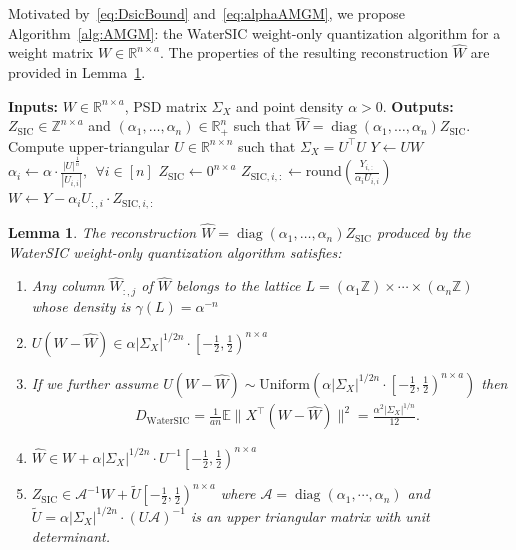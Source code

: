 \documentclass[journal]{IEEEtran}
\newcommand{\ZZ}{\mathbb{Z}}
\newcommand{\RR}{\mathbb{R}}
\newcommand{\diag}{\mathop{\mathrm{diag}}}
\newcommand{\Unif}{\mathrm{Uniform}}
\def\EE{\mathbb{E}}
\newcommand{\m}{\mathcal}
\newtheorem{lemma}{Lemma}
\begin{document}
Motivated by~\eqref{eq:DsicBound} and~\eqref{eq:alphaAMGM}, we propose Algorithm~\ref{alg:AMGM}: the WaterSIC weight-only quantization algorithm for a weight matrix $W\in\RR^{n\times a}$. The properties of the resulting reconstruction $\hat{W}$ are provided in Lemma~\ref{lem:SICAMGM}.

\begin{algorithm*}[h!]
\caption{WaterSIC weight-only quantization}
\label{alg:AMGM}
\begin{algorithmic}
\State \textbf{Inputs:} $W\in\RR^{n\times a}$, PSD matrix $\Sigma_X$ and point density $\alpha>0$.
\State \textbf{Outputs:} $Z_{\mathrm{SIC}}\in \ZZ^{n\times a}$ and $(\alpha_1,\ldots,\alpha_n)\in\RR_+^n$ such that $\hat{W}=\diag(\alpha_1,\ldots,\alpha_n) Z_{\mathrm{SIC}}$.
\vspace{2mm}
\State Compute upper-triangular $U\in\RR^{n\times n}$ such that $\Sigma_X=U^\top U$
\State $Y\gets U W$
\State $\alpha_i\gets\alpha\cdot \frac{|U|^{\frac{1}{n}}}{|U_{i,i}|},~~\forall i\in[n]$
\State $Z_{\mathrm{SIC}}\gets 0^{n\times a}$
\State $Z_{\mathrm{SIC},i,:}\gets \mathrm{round}\left(\frac{Y_{i,:}}{\alpha_i U_{i,i}}\right)$ 
\State $W\gets Y-\alpha_iU_{:,i}\cdot Z_{\mathrm{SIC},i,:}$
\EndFor
\end{algorithmic}
\end{algorithm*}

\begin{lemma}
\label{lem:SICAMGM}
The reconstruction $\hat{W}=\diag(\alpha_1,\ldots,\alpha_n) Z_{\mathrm{SIC}}$ produced by the WaterSIC weight-only quantization algorithm satisfies: 
\begin{enumerate}
\item Any column $\hat{W}_{:,j}$ of $\hat{W}$ belongs to the lattice $L=(\alpha_1\ZZ)\times\cdots\times(\alpha_n\ZZ)$ whose density is $\gamma(L)=\alpha^{-n}$
\item $U(W-\hat{W})\in \alpha|\Sigma_X|^{1/2n}\cdot \left[-\frac{1}{2},\frac{1}{2}\right)^{n\times a}$
\item If we further assume $U(W-\hat{W})\sim\Unif\left( \alpha|\Sigma_X|^{1/2n}\cdot \left[-\frac{1}{2},\frac{1}{2}\right)^{n\times a}\right)$ then
\begin{align}
&D_{\mathrm{WaterSIC}}=\frac{1}{an}\EE\|X^\top(W-\hat{W})\|^2=\frac{\alpha^2|\Sigma_X|^{1/n}}{12}.    \nonumber
\end{align}
\item $\hat{W}\in W+\alpha|\Sigma_X|^{1/2n}\cdot U^{-1}\left[-\frac{1}{2},\frac{1}{2}\right)^{n\times a}$
\item $Z_{\mathrm{SIC}}\in\m{A}^{-1}W+\tilde{U}\left[-\frac{1}{2},\frac{1}{2}\right)^{n\times a}$ where $\m{A}=\diag(\alpha_1,\cdots,\alpha_n)$ and $\tilde{U}=\alpha|\Sigma_X|^{1/2n}\cdot(U\m{A})^{-1}$ is an upper triangular matrix with unit determinant.
\end{enumerate}
\end{lemma}
\end{document}
